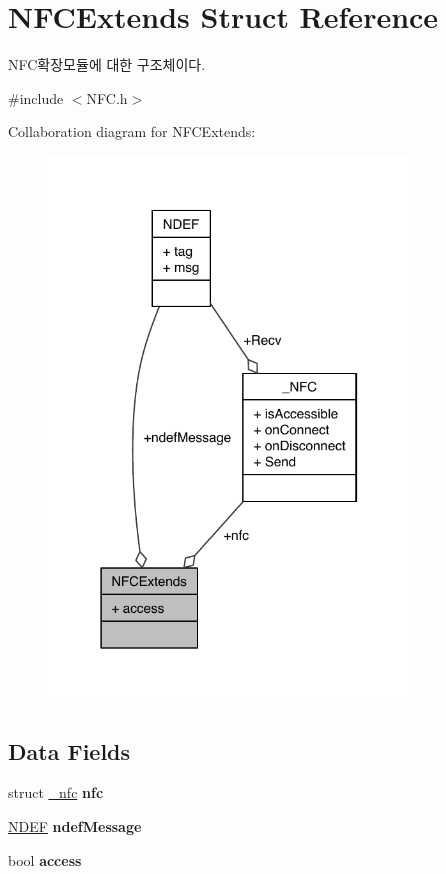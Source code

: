\hypertarget{structNFCExtends}{\section{N\-F\-C\-Extends Struct Reference}
\label{structNFCExtends}
}


N\-F\-C확장모듈에 대한 구조체이다.  




{\ttfamily \#include $<$N\-F\-C.\-h$>$}



Collaboration diagram for N\-F\-C\-Extends\-:\nopagebreak
\begin{figure}[H]
\begin{center}
\leavevmode
\includegraphics[width=271pt]{de/d4d/structNFCExtends__coll__graph}
\end{center}
\end{figure}
\subsection*{Data Fields}
\begin{DoxyCompactItemize}
\item 
\hypertarget{structNFCExtends_acf0441e1462c7b5253838f663761996a}{struct \hyperlink{struct__nfc}{\-\_\-nfc} {\bfseries nfc}}\label{structNFCExtends_acf0441e1462c7b5253838f663761996a}

\item 
\hypertarget{structNFCExtends_af404558710d345372ee7a9bff25f8503}{\hyperlink{structNDEF}{N\-D\-E\-F} {\bfseries ndef\-Message}}\label{structNFCExtends_af404558710d345372ee7a9bff25f8503}

\item 
\hypertarget{structNFCExtends_ab4e2372937bb1eec89f2a954a4db6604}{bool {\bfseries access}}\label{structNFCExtends_ab4e2372937bb1eec89f2a954a4db6604}

\end{DoxyCompactItemize}


